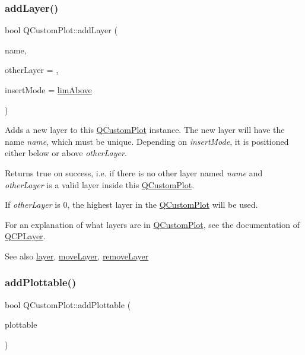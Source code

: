 \subsubsection{\texorpdfstring{add\+Layer()}{addLayer()}}
{\footnotesize\ttfamily bool Q\+Custom\+Plot\+::add\+Layer (\begin{DoxyParamCaption}\item[{const Q\+String \&}]{name,  }\item[{\hyperlink{class_q_c_p_layer}{Q\+C\+P\+Layer} $\ast$}]{other\+Layer = {},  }\item[{\hyperlink{class_q_custom_plot_a75a8afbe6ef333b1f3d47abb25b9add7}{Q\+Custom\+Plot\+::\+Layer\+Insert\+Mode}}]{insert\+Mode = {\ttfamily \hyperlink{class_q_custom_plot_a75a8afbe6ef333b1f3d47abb25b9add7a062b0b7825650b432a713c0df6742d41}{lim\+Above}} }\end{DoxyParamCaption})}

Adds a new layer to this \hyperlink{class_q_custom_plot}{Q\+Custom\+Plot} instance. The new layer will have the name {\itshape name}, which must be unique. Depending on {\itshape insert\+Mode}, it is positioned either below or above {\itshape other\+Layer}.

Returns true on success, i.\+e. if there is no other layer named {\itshape name} and {\itshape other\+Layer} is a valid layer inside this \hyperlink{class_q_custom_plot}{Q\+Custom\+Plot}.

If {\itshape other\+Layer} is 0, the highest layer in the \hyperlink{class_q_custom_plot}{Q\+Custom\+Plot} will be used.

For an explanation of what layers are in \hyperlink{class_q_custom_plot}{Q\+Custom\+Plot}, see the documentation of \hyperlink{class_q_c_p_layer}{Q\+C\+P\+Layer}.

\begin{DoxySeeAlso}{See also}
\hyperlink{class_q_custom_plot_a0a96244e7773b242ef23c32b7bdfb159}{layer}, \hyperlink{class_q_custom_plot_ae896140beff19424e9e9e02d6e331104}{move\+Layer}, \hyperlink{class_q_custom_plot_a40f75e342c5eaab6a86066a42a0e2a94}{remove\+Layer} 
\end{DoxySeeAlso}
\hypertarget{class_q_custom_plot_ab7ad9174f701f9c6f64e378df77927a6}{}\label{class_q_custom_plot_ab7ad9174f701f9c6f64e378df77927a6} 
\subsubsection{\texorpdfstring{add\+Plottable()}{addPlottable()}}
{\footnotesize\ttfamily bool Q\+Custom\+Plot\+::add\+Plottable (\begin{DoxyParamCaption}\item[{\hyperlink{class_q_c_p_abstract_plottable}{Q\+C\+P\+Abstract\+Plottable} $\ast$}]{plottable }\end{DoxyParamCaption})}

